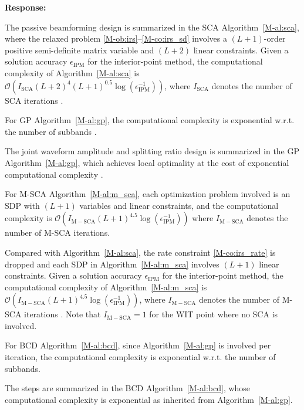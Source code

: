 \documentclass{article}
\newcounter{reviewer}
\newcounter{point}[reviewer]
\newcounter{response}[reviewer]
\newenvironment{response}
	{\refstepcounter{response} \medskip \noindent \textbf{Response:}\ }
	{\medskip}
\begin{document}
\begin{reviewer}
\begin{response}
			\begin{framed}
				The passive beamforming design is summarized in the SCA Algorithm~\ref{M-al:sca}, where the relaxed problem \eqref{M-ob:irs}--\eqref{M-co:irs_sd} involves a $(L+1)$-order positive semi-definite matrix variable and $(L+2)$ linear constraints. Given a solution accuracy $\epsilon_{\mathrm{IPM}}$ for the interior-point method, the computational complexity of Algorithm~\ref{M-al:sca} is $\mathcal{O}\left(I_{\mathrm{SCA}}(L+2)^4 (L+1)^{0.5} \log(\epsilon_{\mathrm{IPM}}^{-1})\right)$, where $I_{\mathrm{SCA}}$ denotes the number of SCA iterations \cite{M-Luo2010}.
			\end{framed}

			For GP Algorithm~\ref{M-al:gp}, the computational complexity is exponential w.r.t. the number of subbands \cite{M-Chiang2005}.
			\begin{framed}
				The joint waveform amplitude and splitting ratio design is summarized in the GP Algorithm~\ref{M-al:gp}, which achieves local optimality at the cost of exponential computational complexity \cite{M-Chiang2005}.
			\end{framed}

			For M-SCA Algorithm~\ref{M-al:m_sca}, each optimization problem involved is an SDP with $(L+1)$ variables and linear constraints, and the computational complexity is $\mathcal{O}\left(I_{\mathrm{M-SCA}}(L+1)^{4.5} \log(\epsilon_{\mathrm{IPM}}^{-1})\right)$ where $I_{\mathrm{M-SCA}}$ denotes the number of M-SCA iterations.
			\begin{framed}
				Compared with Algorithm~\ref{M-al:sca}, the rate constraint \eqref{M-co:irs_rate} is dropped and each SDP in Algorithm~\ref{M-al:m_sca} involves $(L+1)$ linear constraints. Given a solution accuracy $\epsilon_{\mathrm{IPM}}$ for the interior-point method, the computational complexity of Algorithm~\ref{M-al:m_sca} is $\mathcal{O}\left(I_{\mathrm{M-SCA}}(L+1)^{4.5} \log(\epsilon_{\mathrm{IPM}}^{-1})\right)$, where $I_{\mathrm{M-SCA}}$ denotes the number of M-SCA iterations \cite{M-Luo2010}. Note that $I_{\mathrm{M-SCA}}=1$ for the WIT point where no SCA is involved.
			\end{framed}

			For BCD Algorithm~\ref{M-al:bcd}, since Algorithm~\ref{M-al:gp} is involved per iteration, the computational complexity is exponential w.r.t. the number of subbands.
			\begin{framed}
				The steps are summarized in the BCD Algorithm~\ref{M-al:bcd}, whose computational complexity is exponential as inherited from Algorithm~\ref{M-al:gp}.
			\end{framed}


\end{response}
\end{reviewer}
\end{document}
